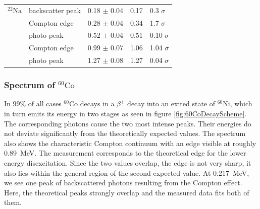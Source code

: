 \begin{center}
\begin{adjustbox}{max width=\linewidth, keepaspectratio}
\begin{tabular}{lllll}
            $^{22}\text{Na}$  & backscatter peak & 0.18 $\pm$ 0.04                              & 0.17                                          & 0.3  $\sigma$ \\
            ~                 & Compton edge     & 0.28 $\pm$ 0.04                              & 0.34                                          & 1.7   $\sigma$ \\
            ~                 & photo peak       & 0.52 $\pm$ 0.04                              & 0.51                                          & 0.10  $\sigma$ \\
            ~                 & Compton edge     & 0.99 $\pm$ 0.07                              & 1.06                                          & 1.04  $\sigma$ \\
            ~                 & photo peak       & 1.27 $\pm$ 0.08                              & 1.27                                          & 0.04 $\sigma$ \\
            \bottomrule
            \end{tabular}
        \end{adjustbox}
        \label{tab:EnergyComparison}
    \end{center}
\endminipage
%
\subsubsection*{Spectrum of $^{60}\text{Co}$}
%
In 99\% of all cases \textbf{$^{60}\text{Co}$} decays in a $\beta^{+}$ decay into an exited state of $^{60}\text{Ni}$, which in turn emits its energy in two stages as seen in figure \ref{fig:60CoDecayScheme}.
The corresponding photons cause the two most intense peaks.
Their energies do not deviate significantly from the theoretically expected values.
The spectrum also shows the characteristic Compton continuum with an edge visible at roughly \SI{0.89}{\mega\electronvolt}.
The measurement corresponds to the theoretical edge for the lower energy disexcitation.
Since the two values overlap, the edge is not very sharp, it also lies within the general region of the second expected value.
At \SI{0.217}{\mega\electronvolt}, we see one peak of backscattered photons resulting from the Compton effect.
Here, the theoretical peaks strongly overlap and the measured data fits both of them.
%
